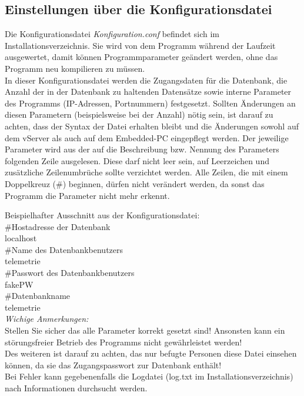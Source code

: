 \documentclass[fontsize = 12pt, paper = a4]{scrreprt}
\begin{document}
 \subsection{Einstellungen über die Konfigurationsdatei}
Die Konfigurationsdatei \textit{Konfiguration.conf} befindet sich im Installationsverzeichnis. Sie wird von dem Programm während der Laufzeit ausgewertet, damit können Programmparameter geändert werden, ohne das Programm neu kompilieren zu müssen.\\
In dieser Konfigurationsdatei werden die Zugangsdaten für die Datenbank, die Anzahl der in der Datenbank zu haltenden Datensätze sowie interne Parameter des Programms (IP-Adressen, Portnummern) festgesetzt.
Sollten Änderungen an diesen Parametern (beispielsweise bei der Anzahl) nötig sein, ist darauf zu achten, dass der Syntax der Datei erhalten bleibt und die Änderungen sowohl auf dem vServer als auch auf dem Embedded-PC eingepflegt werden.
Der jeweilige Parameter wird aus der auf die Beschreibung bzw. Nennung des Parameters folgenden Zeile ausgelesen. 
Diese darf nicht leer sein, auf Leerzeichen und zusätzliche Zeilenumbrüche sollte verzichtet werden.
Alle Zeilen, die mit einem Doppelkreuz (\#) beginnen, dürfen nicht verändert werden, da sonst das Programm die Parameter nicht mehr erkennt.

Beispielhafter Ausschnitt aus der Konfigurationsdatei:\\

    \#Hostadresse der Datenbank\\
    localhost\\

    \#Name des Datenbankbenutzers\\
    telemetrie\\

    \#Passwort des Datenbankbenutzers\\
    fakePW\\

    \#Datenbankname\\
    telemetrie\\

\textit{Wichige Anmerkungen:}\\
Stellen Sie sicher das alle Parameter korrekt gesetzt sind! Ansonsten kann ein störungsfreier Betrieb des Programms nicht gewährleistet werden!\\
Des weiteren ist darauf zu achten, das nur befugte Personen diese Datei einsehen können, da sie das Zugangspasswort zur Datenbank enthält!\\
Bei Fehler kann gegebenenfalls die Logdatei (log.txt im Installationsverzeichnis) nach Informationen durchsucht werden.
\end{document}

